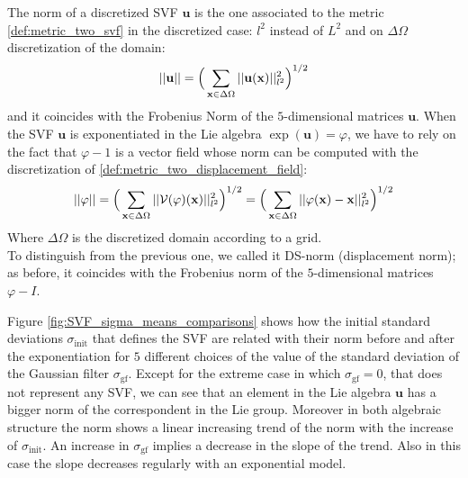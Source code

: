 The norm of a discretized SVF $\mathbf{u}$ is the one associated to the metric \ref{def:metric_two_svf} in the discretized case: $l^2$ instead of $L^2$ and on $\Delta\Omega$ discretization of the domain:
\begin{align*}
\vert\lvert \mathbf{u} \rvert\vert  
= 
\Big( \sum_{\mathbf{x} \in \Delta\Omega} \vert\lvert \mathbf{u}(\mathbf{x})  \rvert\vert_{l^2}^{2}  \Big)^{1/2}
\end{align*} 
and it coincides with the Frobenius Norm of the $5$-dimensional matrices $\mathbf{u}$.
When the SVF $\mathbf{u}$ is exponentiated in the Lie algebra $\exp(\mathbf{u}) = \varphi$, we have to rely on the fact that $\varphi - 1$ is a vector field whose norm can be computed with the discretization of \ref{def:metric_two_displacement_field}:
\begin{align*}
\vert\lvert \varphi \rvert\vert  
= 
\Big( \sum_{\mathbf{x} \in \Delta\Omega} \vert\lvert \mathcal{V}(\varphi)(\mathbf{x})  \rvert\vert_{l^2}^{2}  \Big)^{1/2}
=
\Big( \sum_{\mathbf{x} \in \Delta\Omega} \vert\lvert \varphi(\mathbf{x}) - \mathbf{x}  \rvert\vert_{l^2}^{2}  \Big)^{1/2}
\end{align*} 
Where $\Delta\Omega$ is the discretized domain according to a grid.\\
To distinguish from the previous one, we called it DS-norm (displacement norm); as before, it coincides with the Frobenius norm of the $5$-dimensional matrices $\varphi - I$.

Figure \ref{fig:SVF_sigma_means_comparisons} shows how the initial standard deviations $\sigma_{\text{init}}$ that defines the SVF are related with their norm before and after the exponentiation for $5$ different choices of the value of the standard deviation of the Gaussian filter $\sigma_{\text{gf}}$.
Except for the extreme case in which $\sigma_{\text{gf}} = 0$, that does not represent any SVF, we can see that an element in the Lie algebra $\mathbf{u}$ has a bigger norm of the correspondent in the Lie group. Moreover in both algebraic structure the norm shows a linear increasing trend of the norm with the increase of $\sigma_{\text{init}}$. An increase in $\sigma_{\text{gf}} $ implies a decrease in the slope of the trend. Also in this case the slope decreases regularly with an exponential model. 

